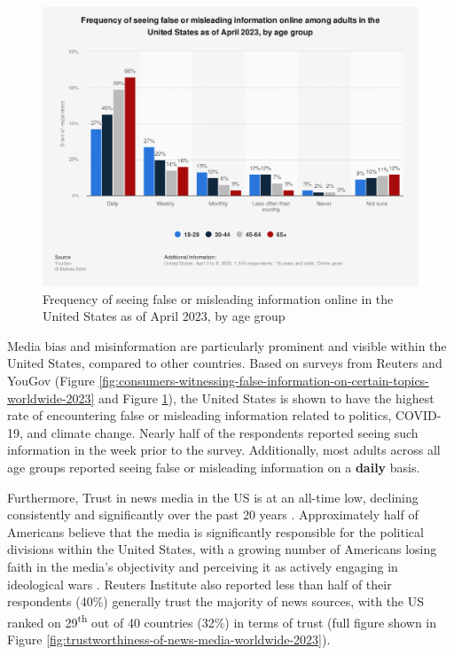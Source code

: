 \begin{figure}[htbp]
    \centering
    \includegraphics[width=0.9\linewidth]{images/statistic_id1462057_frequency-of-seeing-false-information-online-in-the-us-2023-by-age-group.png}
    \caption{Frequency of seeing false or misleading information online in the United States as of April 2023, by age group \cite{yougov-2023-frequency}}
    \label{fig:frequency-of-seeing-false-information-online-in-the-us-2023-by-age-group}
\end{figure}


Media bias and misinformation are particularly prominent and visible within the United States, compared to other countries. Based on surveys from Reuters \cite{reuters-2023-false-info} and YouGov \cite{yougov-2023-frequency} (Figure \ref{fig:consumers-witnessing-false-information-on-certain-topics-worldwide-2023} and Figure \ref{fig:frequency-of-seeing-false-information-online-in-the-us-2023-by-age-group}), the United States is shown to have the highest rate of encountering false or misleading information related to politics, COVID-19, and climate change. Nearly half of the respondents reported seeing such information in the week prior to the survey. Additionally, most adults across all age groups reported seeing false or misleading information on a \textbf{daily} basis.

Furthermore, Trust in news media in the US is at an all-time low, declining consistently and significantly over the past 20 years \cite{pew-2021-partisan-divides, gallup-knight-2020-american-views, reuters-2023-digital-news-report}. Approximately half of Americans believe that the media is significantly responsible for the political divisions within the United States, with a growing number of Americans losing faith in the media's objectivity and perceiving it as actively engaging in ideological wars \cite{gallup-knight-2020-american-views}. Reuters Institute also reported less than half of their respondents (40\%) generally trust the majority of news sources, with the US ranked on 29\textsuperscript{th} out of 40 countries (32\%) in terms of trust \cite{reuters-2023-digital-news-report,reuters-2023-trust} (full figure shown in Figure \ref{fig:trustworthiness-of-news-media-worldwide-2023}).

